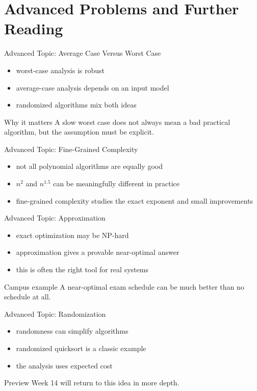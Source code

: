 \documentclass[aspectratio=169,xcolor=dvipsnames]{beamer}
\begin{document}
\section{Advanced Problems and Further Reading}
\begin{frame}{Advanced Topic: Average Case Versus Worst Case}
  \begin{itemize}
    \item worst-case analysis is robust
    \item average-case analysis depends on an input model
    \item randomized algorithms mix both ideas
  \end{itemize}
  \begin{block}{Why it matters}
    A slow worst case does not always mean a bad practical algorithm, but the assumption must be explicit.
  \end{block}
\end{frame}

\begin{frame}{Advanced Topic: Fine-Grained Complexity}
  \begin{itemize}
    \item not all polynomial algorithms are equally good
    \item $n^{2}$ and $n^{1.5}$ can be meaningfully different in practice
    \item fine-grained complexity studies the exact exponent and small improvements
  \end{itemize}
\end{frame}

\begin{frame}{Advanced Topic: Approximation}
  \begin{itemize}
    \item exact optimization may be NP-hard
    \item approximation gives a provable near-optimal answer
    \item this is often the right tool for real systems
  \end{itemize}
  \begin{exampleblock}{Campus example}
    A near-optimal exam schedule can be much better than no schedule at all.
  \end{exampleblock}
\end{frame}

\begin{frame}{Advanced Topic: Randomization}
  \begin{itemize}
    \item randomness can simplify algorithms
    \item randomized quicksort is a classic example
    \item the analysis uses expected cost
  \end{itemize}
  \begin{block}{Preview}
    Week 14 will return to this idea in more depth.
  \end{block}
\end{frame}
\end{document}
